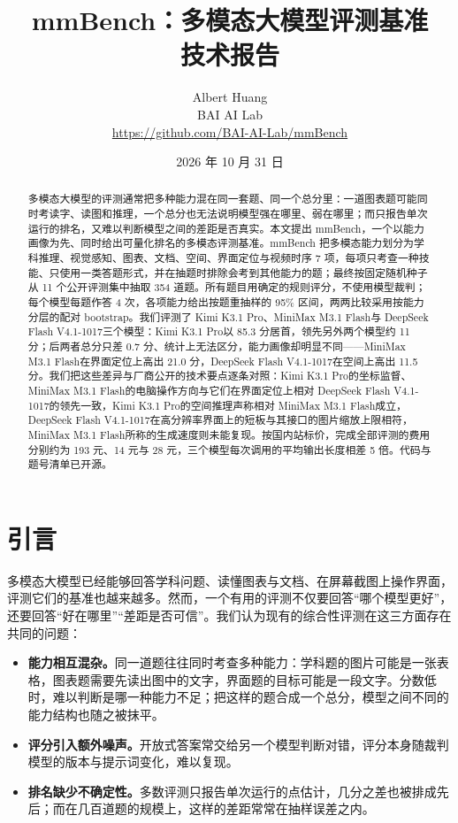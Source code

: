 \documentclass[11pt,a4paper,fontset=none]{ctexart}
\title{\textbf{mmBench：多模态大模型评测基准}\\[0.3em]\large 技术报告}
\author{Albert Huang\\BAI AI Lab\\\small\url{https://github.com/BAI-AI-Lab/mmBench}}
\date{2026 年 10 月 31 日}
\newcommand{\kimi}{Kimi K3.1 Pro}
\newcommand{\mini}{MiniMax M3.1 Flash}
\newcommand{\ds}{DeepSeek Flash V4.1-1017}
\newcommand{\lead}[1]{\textbf{#1}\quad}
\begin{document}
\maketitle

\begin{abstract}
多模态大模型的评测通常把多种能力混在同一套题、同一个总分里：一道图表题可能同时考读字、读图和推理，一个总分也无法说明模型强在哪里、弱在哪里；而只报告单次运行的排名，又难以判断模型之间的差距是否真实。本文提出 mmBench，一个以能力画像为先、同时给出可量化排名的多模态评测基准。mmBench 把多模态能力划分为学科推理、视觉感知、图表、文档、空间、界面定位与视频时序 7 项，每项只考查一种技能、只使用一类答题形式，并在抽题时排除会考到其他能力的题；最终按固定随机种子从 11 个公开评测集中抽取 354 道题。所有题目用确定的规则评分，不使用模型裁判；每个模型每题作答 4 次，各项能力给出按题重抽样的 95\% 区间，两两比较采用按能力分层的配对 bootstrap。我们评测了 \kimi、\mini 与 \ds 三个模型：\kimi 以 85.3 分居首，领先另外两个模型约 11 分；后两者总分只差 0.7 分、统计上无法区分，能力画像却明显不同——\mini 在界面定位上高出 21.0 分，\ds 在空间上高出 11.5 分。我们把这些差异与厂商公开的技术要点逐条对照：\kimi 的坐标监督、\mini 的电脑操作方向与它们在界面定位上相对 \ds 的领先一致，\kimi 的空间推理声称相对 \mini 成立，\ds 在高分辨率界面上的短板与其接口的图片缩放上限相符，\mini 所称的生成速度则未能复现。按国内站标价，完成全部评测的费用分别约为 193 元、14 元与 28 元，三个模型每次调用的平均输出长度相差 5 倍。代码与题号清单已开源。
\end{abstract}

\section{引言}

多模态大模型已经能够回答学科问题、读懂图表与文档、在屏幕截图上操作界面，评测它们的基准也越来越多。然而，一个有用的评测不仅要回答“哪个模型更好”，还要回答“好在哪里”“差距是否可信”。我们认为现有的综合性评测在这三方面存在共同的问题：

\begin{itemize}[leftmargin=1.6em]
  \item \lead{能力相互混杂。}同一道题往往同时考查多种能力：学科题的图片可能是一张表格，图表题需要先读出图中的文字，界面题的目标可能是一段文字。分数低时，难以判断是哪一种能力不足；把这样的题合成一个总分，模型之间不同的能力结构也随之被抹平。
  \item \lead{评分引入额外噪声。}开放式答案常交给另一个模型判断对错，评分本身随裁判模型的版本与提示词变化，难以复现。
  \item \lead{排名缺少不确定性。}多数评测只报告单次运行的点估计，几分之差也被排成先后；而在几百道题的规模上，这样的差距常常在抽样误差之内。
\end{itemize}
\end{document}
